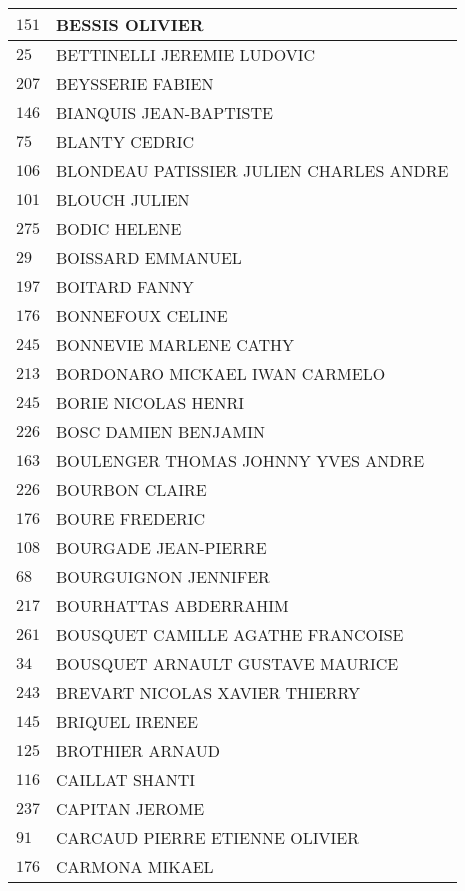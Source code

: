 \begin{xltabular}{\linewidth}{|l|X|}
    \hline
    $151$ & BESSIS OLIVIER \\
    \hline
    $25$ & BETTINELLI JEREMIE LUDOVIC \\
    \hline
    $207$ & BEYSSERIE FABIEN \\
    \hline
    $146$ & BIANQUIS JEAN-BAPTISTE \\
    \hline
    $75$ & BLANTY CEDRIC \\
    \hline
    $106$ & BLONDEAU PATISSIER JULIEN CHARLES ANDRE \\
    \hline
    $101$ & BLOUCH JULIEN \\
    \hline
    $275$ & BODIC HELENE \\
    \hline
    $29$ & BOISSARD EMMANUEL \\
    \hline
    $197$ & BOITARD FANNY \\
    \hline
    $176$ & BONNEFOUX CELINE \\
    \hline
    $245$ & BONNEVIE MARLENE CATHY \\
    \hline
    $213$ & BORDONARO MICKAEL IWAN CARMELO \\
    \hline
    $245$ & BORIE NICOLAS HENRI \\
    \hline
    $226$ & BOSC DAMIEN BENJAMIN \\
    \hline
    $163$ & BOULENGER THOMAS JOHNNY YVES ANDRE \\
    \hline
    $226$ & BOURBON CLAIRE \\
    \hline
    $176$ & BOURE FREDERIC \\
    \hline
    $108$ & BOURGADE JEAN-PIERRE \\
    \hline
    $68$ & BOURGUIGNON JENNIFER \\
    \hline
    $217$ & BOURHATTAS ABDERRAHIM \\
    \hline
    $261$ & BOUSQUET CAMILLE AGATHE FRANCOISE \\
    \hline
    $34$ & BOUSQUET ARNAULT GUSTAVE MAURICE \\
    \hline
    $243$ & BREVART NICOLAS XAVIER THIERRY \\
    \hline
    $145$ & BRIQUEL IRENEE \\
    \hline
    $125$ & BROTHIER ARNAUD \\
    \hline
    $116$ & CAILLAT SHANTI \\
    \hline
    $237$ & CAPITAN JEROME \\
    \hline
    $91$ & CARCAUD PIERRE ETIENNE OLIVIER \\
    \hline
    $176$ & CARMONA MIKAEL \\

\end{xltabular}
